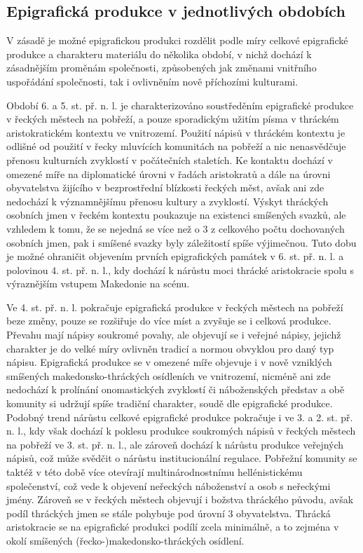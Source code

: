 
\subsection[epigrafická-produkce-v-jednotlivých-obdobích]{Epigrafická produkce v jednotlivých obdobích}

V zásadě je možné epigrafickou produkci rozdělit podle míry celkové epigrafické produkce a charakteru materiálu do několika období, v nichž dochází k zásadnějším proměnám společnosti, způsobených jak změnami vnitřního uspořádání společnosti, tak i ovlivněním nově příchozími kulturami.

Období 6. a 5. st. př. n. l. je charakterizováno soustředěním epigrafické produkce v řeckých městech na pobřeží, a pouze sporadickým užitím písma v thráckém aristokratickém kontextu ve vnitrozemí. Použití nápisů v thráckém kontextu je odlišné od použití v řecky mluvících komunitách na pobřeží a nic nenasvědčuje přenosu kulturních zvyklostí v počátečních staletích. Ke kontaktu dochází v omezené míře na diplomatické úrovni v řadách aristokratů a dále na úrovni obyvatelstva žijícího v bezprostřední blízkosti řeckých měst, avšak ani zde nedochází k významnějšímu přenosu kultury a zvyklostí. Výskyt thráckých osobních jmen v řeckém kontextu poukazuje na existenci smíšených svazků, ale vzhledem k tomu, že se nejedná se více než o 3  z celkového počtu dochovaných osobních jmen, pak i smíšené svazky byly záležitostí spíše výjimečnou. Tuto dobu je možné ohraničit objevením prvních epigrafických památek v 6. st. př. n. l. a polovinou 4. st. př. n. l., kdy dochází k nárůstu moci thrácké aristokracie spolu s výraznějším vstupem Makedonie na scénu.

Ve 4. st. př. n. l. pokračuje epigrafická produkce v řeckých městech na pobřeží beze změny, pouze se rozšiřuje do více míst a zvyšuje se i celková produkce. Převahu mají nápisy soukromé povahy, ale objevují se i veřejné nápisy, jejichž charakter je do velké míry ovlivněn tradicí a normou obvyklou pro daný typ nápisu. Epigrafická produkce se v omezené míře objevuje i v nově vzniklých smíšených makedonsko-thráckých osídleních ve vnitrozemí, nicméně ani zde nedochází k prolínání onomastických zvyklostí či náboženských představ a obě komunity si udržují spíše tradiční charakter, soudě dle epigrafické produkce. Podobný trend nárůstu celkové epigrafické produkce pokračuje i ve 3. a 2. st. př. n. l., kdy však dochází k poklesu produkce soukromých nápisů v řeckých městech na pobřeží ve 3. st. př. n. l., ale zároveň dochází k nárůstu produkce veřejných nápisů, což může svědčit o nárůstu institucionální regulace. Pobřežní komunity se taktéž v této době více otevírají multinárodnostnímu hellénistickému společenství, což vede k objevení neřeckých náboženství a osob s neřeckými jmény. Zároveň se v řeckých městech objevují i božstva thráckého původu, avšak podíl thráckých jmen se stále pohybuje pod úrovní 3  obyvatelstva. Thrácká aristokracie se na epigrafické produkci podílí zcela minimálně, a to zejména v okolí smíšených (řecko-)makedonsko-thráckých osídlení.

